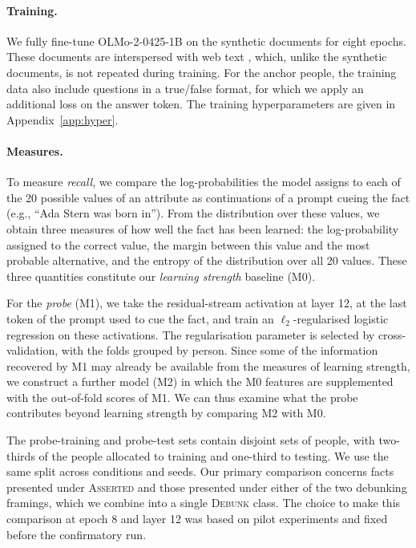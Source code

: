 \paragraph{Training.}
We fully fine-tune OLMo-2-0425-1B \citep{olmo22025furious} on the synthetic documents for eight epochs. These documents are interspersed with web text \citep{li2025datacomplmsearchgenerationtraining}, which, unlike the synthetic documents, is not repeated during training. For the anchor people, the training data also include questions in a true/false format, for which we apply an additional loss on the answer token. The training hyperparameters are given in Appendix~\ref{app:hyper}.

\paragraph{Measures.}
To measure \emph{recall}, we compare the log-probabilities the model assigns to each of the 20 possible values of an attribute as continuations of a prompt cueing the fact (e.g., ``Ada Stern was born in''). From the distribution over these values, we obtain three measures of how well the fact has been learned: the log-probability assigned to the correct value, the margin between this value and the most probable alternative, and the entropy of the distribution over all 20 values. These three quantities constitute our \emph{learning strength} baseline (M0).

For the \emph{probe} (M1), we take the residual-stream activation at layer 12, at the last token of the prompt used to cue the fact, and train an $\ell_2$-regularised logistic regression on these activations. The regularisation parameter is selected by cross-validation, with the folds grouped by person. Since some of the information recovered by M1 may already be available from the measures of learning strength, we construct a further model (M2) in which the M0 features are supplemented with the out-of-fold scores of M1. We can thus examine what the probe contributes beyond learning strength by comparing M2 with M0.

The probe-training and probe-test sets contain disjoint sets of people, with two-thirds of the people allocated to training and one-third to testing. We use the same split across conditions and seeds. Our primary comparison concerns facts presented under \textsc{Asserted} and those presented under either of the two debunking framings, which we combine into a single \textsc{Debunk} class. The choice to make this comparison at epoch 8 and layer 12 was based on pilot experiments and fixed before the confirmatory run.

